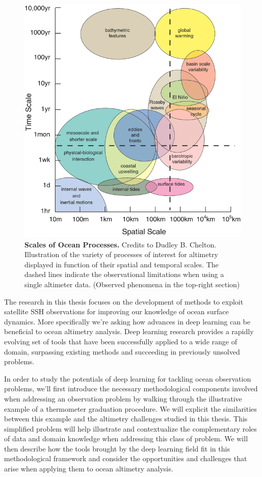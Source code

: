 \begin{bibunit}
\begin{figure}[H]
\centering    
  \includegraphics[width=12cm]{Introduction/web_space_time_scales.png}%

    
    \caption{\textbf{Scales of Ocean Processes.} Credits to Dudley B. Chelton. Illustration of the variety of processes of interest for altimetry displayed in function of their spatial and temporal scales. The dashed lines indicate the observational limitations when using a single altimeter data. (Observed phenomena in the top-right section) }
    \label{fig:ocean_processes}
\end{figure}

  The research in this thesis focuses on the development of methods to exploit satellite SSH observations for improving our knowledge of ocean surface dynamics. 
  More specifically we're asking how advances in deep learning can be beneficial to ocean altimetry analysis.
  Deep learning research provides a rapidly evolving set of tools that have been successfully applied to a wide range of domain, surpassing existing methods and succeeding in previously unsolved problems.

  
  In order to study the potentials of deep learning for tackling ocean observation problems, we'll first introduce the necessary methodological components involved when addressing an observation problem by walking through the illustrative example of a thermometer graduation procedure.
  We will explicit the similarities between this example and the altimetry challenges studied in this thesis.
 This simplified problem will help illustrate and contextualize the complementary roles of data and domain knowledge when addressing this class of problem. 
  We will then describe how the tools brought by the deep learning field fit in this methodological framework and consider the opportunities and challenges that arise when applying them to ocean altimetry analysis.



\end{bibunit}
